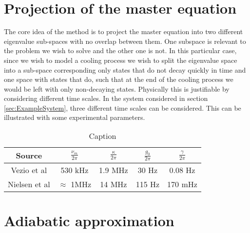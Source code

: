\documentclass[12pt]{article}
\begin{document}
\section{Projection of the master equation}

The core idea of the method is to project the master equation into two different eigenvalue sub-spaces with no overlap between them. One subspace is relevant to the problem we wish to solve and the other one is not. In this particular case, since we wish to model a cooling process we wish to split the eigenvalue space into a sub-space corresponding only states that do not decay quickly in time and one space with states that do, such that at the end of the cooling process we would be left with only non-decaying states. Physically this is justifiable by considering different time scales. In the system considered in section \ref{sec:ExampleSystem}, three different time scales can be considered. This can be illustrated with some experimental parameters.

\begin{table}[]
    \centering
    \begin{tabular}{|c|c|c|c|c|}
        \hline
        Source & $\frac{\nu_m}{2\pi}$ & $\frac{\kappa}{2\pi}$ & $\frac{g_0}{2\pi}$&  $\frac{\gamma}{2\pi}$  \\
        \hline\hline
        Vezio et al \cite{VezioOMExperiment2020} & 530 kHz & 1.9 MHz &  30 Hz & 0.08 Hz \\
        \hline
        Nielsen et al \cite{NielsenMultimodeOptomechanicalMembrane2017} & $\approx$ 1MHz & 14 MHz & 115 Hz & 170 mHz\\
    \end{tabular}
    \caption{Caption}
    \label{tab:my_label}
\end{table}


\section{Adiabatic approximation}



\end{document}
